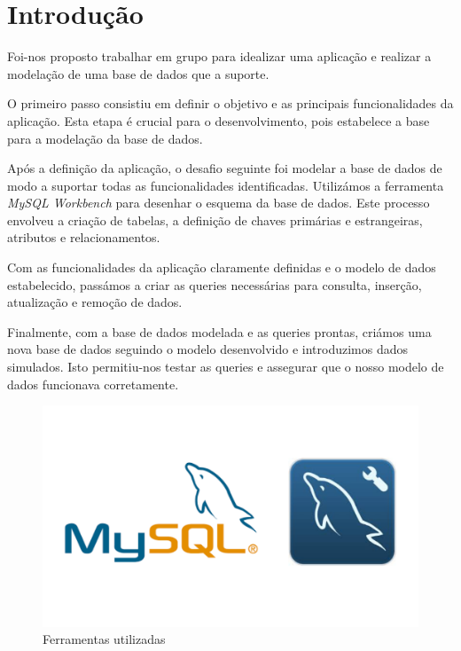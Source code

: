 \section{Introdução} \label{section: Introducao}
Foi-nos proposto trabalhar em grupo para idealizar uma aplicação e realizar a modelação de uma base de dados que a suporte.
\par \vspace{6pt}
O primeiro passo consistiu em definir o objetivo e as principais funcionalidades da aplicação. Esta etapa é crucial para o desenvolvimento, pois estabelece a base para a modelação da base de dados.
\par \vspace{6pt}
Após a definição da aplicação, o desafio seguinte foi modelar a base de dados de modo a suportar todas as funcionalidades identificadas. Utilizámos a ferramenta \textit{MySQL Workbench} para desenhar o esquema da base de dados. Este processo envolveu a criação de tabelas, a definição de chaves primárias e estrangeiras, atributos e relacionamentos.
\par \vspace{6pt}
Com as funcionalidades da aplicação claramente definidas e o modelo de dados estabelecido, passámos a criar as queries necessárias para consulta, inserção, atualização e remoção de dados.
\par \vspace{6pt}
Finalmente, com a base de dados modelada e as queries prontas, criámos uma nova base de dados seguindo o modelo desenvolvido e introduzimos dados simulados. Isto permitiu-nos testar as queries e assegurar que o nosso modelo de dados funcionava corretamente.

\vspace{6pt}

\begin{figure}[H]
    \centering
    \includegraphics[width=\textwidth]{Figures/0. General/ferramentas.png}
    \caption{Ferramentas utilizadas}
    \label{Ferramentas utilizadas}
\end{figure}